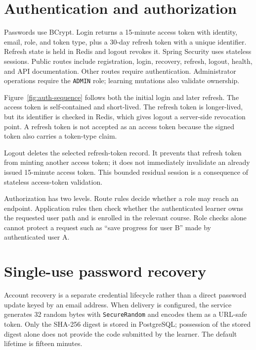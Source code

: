 \documentclass[12pt,a4paper,oneside]{report}
\begin{document}
\section{Authentication and authorization}
Passwords use BCrypt. Login returns a 15-minute access token with identity, email,
role, and token type, plus a 30-day refresh token with a unique identifier. Refresh
state is held in Redis and logout revokes it. Spring Security uses stateless sessions.
Public routes include registration, login, recovery, refresh, logout, health, and
API documentation. Other routes require authentication. Administrator operations
require the \texttt{ADMIN} role; learning mutations also validate ownership.

Figure~\ref{fig:auth-sequence} follows both the initial login and later refresh.
The access token is self-contained and short-lived. The refresh token is longer-lived,
but its identifier is checked in Redis, which gives logout a server-side revocation
point. A refresh token is not accepted as an access token because the signed token
also carries a token-type claim.

Logout deletes the selected refresh-token record. It prevents that refresh token from
minting another access token; it does not immediately invalidate an already issued
15-minute access token. This bounded residual session is a consequence of stateless
access-token validation.

\authsequencediagram

Authorization has two levels. Route rules decide whether a role may reach an endpoint.
Application rules then check whether the authenticated learner owns the requested
user path and is enrolled in the relevant course. Role checks alone cannot protect a
request such as ``save progress for user B'' made by authenticated user A.

\section{Single-use password recovery}
Account recovery is a separate credential lifecycle rather than a direct password
update keyed by an email address. When delivery is configured, the service generates
32 random bytes with \texttt{SecureRandom} and encodes them as a URL-safe token. Only
the SHA-256 digest is stored in PostgreSQL; possession of the stored digest alone does
not provide the code submitted by the learner. The default lifetime is fifteen minutes.

\passwordresetdiagram
\end{document}
